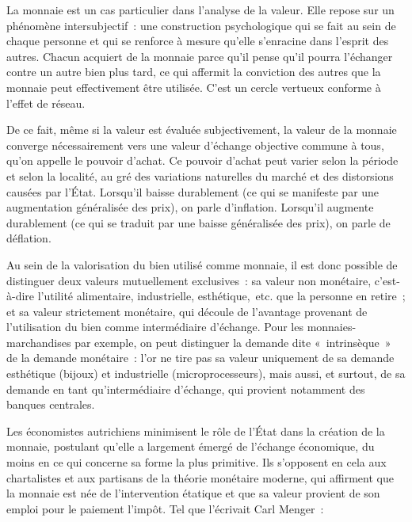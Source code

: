 
La monnaie est un cas particulier dans l'analyse de la valeur. Elle repose sur un phénomène intersubjectif~: une construction psychologique qui se fait au sein de chaque personne et qui se renforce à mesure qu'elle s'enracine dans l'esprit des autres. Chacun acquiert de la monnaie parce qu'il pense qu'il pourra l'échanger contre un autre bien plus tard, ce qui affermit la conviction des autres que la monnaie peut effectivement être utilisée. C'est un cercle vertueux conforme à l'effet de réseau.

De ce fait, même si la valeur est évaluée subjectivement, la valeur de la monnaie converge nécessairement vers une valeur d'échange objective commune à tous, qu'on appelle le pouvoir d'achat. Ce pouvoir d'achat peut varier selon la période et selon la localité, au gré des variations naturelles du marché et des distorsions causées par l'État. Lorsqu'il baisse durablement (ce qui se manifeste par une augmentation généralisée des prix), on parle d'inflation. Lorsqu'il augmente durablement (ce qui se traduit par une baisse généralisée des prix), on parle de déflation.

Au sein de la valorisation du bien utilisé comme monnaie, il est donc possible de distinguer deux valeurs mutuellement exclusives~: sa valeur non monétaire, c'est-à-dire l'utilité alimentaire, industrielle, esthétique,~etc. que la personne en retire~; et sa valeur strictement monétaire, qui découle de l'avantage provenant de l'utilisation du bien comme intermédiaire d'échange. Pour les monnaies-marchandises par exemple, on peut distinguer la demande dite «~intrinsèque~» de la demande monétaire~: l'or ne tire pas sa valeur uniquement de sa demande esthétique (bijoux) et industrielle (microprocesseurs), mais aussi, et surtout, de sa demande en tant qu'intermédiaire d'échange, qui provient notamment des banques centrales.


Les économistes autrichiens minimisent le rôle de l'État dans la création de la monnaie, postulant qu'elle a largement émergé de l'échange économique, du moins en ce qui concerne sa forme la plus primitive. Ils s'opposent en cela aux chartalistes et aux partisans de la théorie monétaire moderne, qui affirment que la monnaie est née de l'intervention étatique et que sa valeur provient de son emploi pour le paiement l'impôt. Tel que l'écrivait Carl Menger~:

